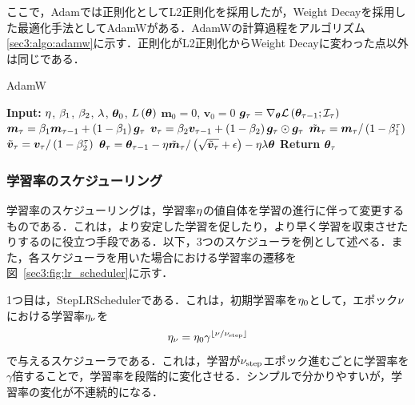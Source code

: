 ここで，Adamでは正則化としてL2正則化を採用したが，Weight Decayを採用した最適化手法としてAdamW\cite{loshchilov2017decoupled}がある．AdamWの計算過程をアルゴリズム\ref{sec3:algo:adamw}に示す．正則化がL2正則化からWeight Decayに変わった点以外は同じである．
\begin{algorithm}
    \caption{AdamW}
    \label{sec3:algo:adamw}
    \begin{algorithmic}[1]
        \State \textbf{Input:} $\eta$, $\beta_{1}$, $\beta_{2}$, $\lambda$, $\bm{\theta}_{0}$, $L\left(\bm{\theta}\right)$
        \State $\bm{m}_{0} = 0$, $\bm{v}_{0} = 0$
        \State $\bm{g}_{\tau} = \nabla_{\bm{\theta}} \mathcal{L}\left(\bm{\theta}_{\tau - 1}; \mathcal{I}_{\tau}\right)$
        \State $\bm{m}_{\tau} = \beta_{1} \bm{m}_{\tau - 1} + \left(1 - \beta_{1}\right) \bm{g}_{\tau}$
        \State $\bm{v}_{\tau} = \beta_{2} \bm{v}_{\tau - 1} + \left(1 - \beta_{2}\right) \bm{g}_{\tau} \odot \bm{g}_{\tau}$
        \State $\tilde{\bm{m}}_{\tau} = \bm{m}_{\tau} / \left(1 - \beta_{1}^{\tau}\right)$
        \State $\tilde{\bm{v}}_{\tau} = \bm{v}_{\tau} / \left(1 - \beta_{2}^{\tau}\right)$
        \State $\bm{\theta}_{\tau} = \bm{\theta}_{\tau - 1} - \eta \tilde{\bm{m}}_{\tau} / \left(\sqrt{\tilde{\bm{v}}_{\tau}} + \epsilon\right) - \eta \lambda \bm{\theta}$
        \EndFor
        \State \textbf{Return} $\bm{\theta}_{\tau}$
    \end{algorithmic}
\end{algorithm}

\subsubsection{学習率のスケジューリング}
学習率のスケジューリングは，学習率$\eta$の値自体を学習の進行に伴って変更するものである．これは，より安定した学習を促したり，より早く学習を収束させたりするのに役立つ手段である．以下，3つのスケジューラを例として述べる．また，各スケジューラを用いた場合における学習率の遷移を図~\ref{sec3:fig:lr_scheduler}に示す．

1つ目は，StepLRSchedulerである．これは，初期学習率を$\eta_{0}$として，エポック$\nu$における学習率$\eta_{\nu}$を
\begin{equation}
    \eta_{\nu} = \eta_{0} \gamma^{\left\lfloor \nu / \nu_{\text{step}} \right\rfloor}
\end{equation}
で与えるスケジューラである．これは，学習が$\nu_{\text{step}}$エポック進むごとに学習率を$\gamma$倍することで，学習率を段階的に変化させる．シンプルで分かりやすいが，学習率の変化が不連続的になる．

